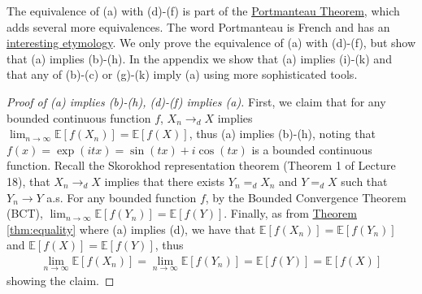 \documentclass{article}
\theoremstyle{definition}
\newcommand{\E}{\mathbb E}
\newcommand{\1}{\mathbb I}
\newcommand{\thmhref}[1]{\hyperref[#1]{Theorem \ref{#1}}}
\begin{document}
The equivalence of (a) with (d)-(f) is part of the
\href{http://en.wikipedia.org/wiki/Portmanteau_theorem}{Portmanteau
  Theorem}, which adds several more equivalences.  The word
Portmanteau is French and has an
\href{http://en.wikipedia.org/wiki/Portmanteau#Origin}{interesting
  etymology}.  We only prove the equivalence of (a) with (d)-(f), but
show that (a) implies (b)-(h).  In the appendix we show
that (a) implies (i)-(k) and that any of (b)-(c) or (g)-(k) imply (a) using
more sophisticated tools.
\begin{proof}[Proof of (a) implies (b)-(h), (d)-(f) implies (a)]
  First, we claim that for any bounded continuous function $f$, $X_n
  \to_d X$ implies \mbox{$\lim_{n \to \infty} \E[f(X_n)] = \E[f(X)]$,} thus
  (a) implies (b)-(h), noting that $f(x) = \exp(itx) = \sin(tx) +
  i\cos(tx)$ is a bounded continuous function.  Recall the Skorokhod
  representation theorem (Theorem 1 of Lecture 18), that $X_n \to_d X$
  implies that there exists $Y_n =_d X_n$ and $Y =_d X$ such that $Y_n
  \to Y$ a.s.  For any bounded function $f$, by the Bounded
  Convergence Theorem (BCT), $\lim_{n \to \infty} \E[f(Y_n)] =
  \E[f(Y)]$.  Finally, as from \thmhref{thm:equality} where (a)
  implies (d), we have that $\E[f(X_n)] = \E[f(Y_n)]$ and $\E[f(X)] =
  \E[f(Y)]$, thus
  \begin{align*}
    \lim_{n \to \infty} \E[f(X_n)] =\lim_{n \to \infty} \E[f(Y_n)] = \E[f(Y)] =  \E[f(X)]
  \end{align*}
  showing the claim.


\end{proof}
\end{document}
